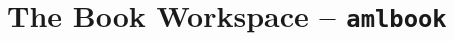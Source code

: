 
\chapter[The Book Workspace -- amlbook]{The Book Workspace -- \lstinline!amlbook!}
\label{ch:tools-amlbook}








